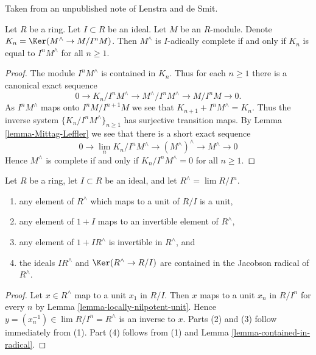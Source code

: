 \begin{lemma}
\label{lemma-hathat}
\begin{reference}
Taken from an unpublished note of Lenstra and de Smit.
\end{reference}
Let $R$ be a ring. Let $I \subset R$ be an ideal. Let $M$ be an $R$-module.
Denote $K_n = \Ker(M^\wedge \to M/I^nM)$. Then $M^\wedge$ is $I$-adically
complete if and only if $K_n$ is equal to $I^nM^\wedge$ for all $n \geq 1$.
\end{lemma}

\begin{proof}
The module $I^n M^\wedge$ is contained in $K_n$.
Thus for each $n \geq 1$ there is a canonical exact sequence
$$
0 \to K_n/I^nM^\wedge \to M^\wedge/I^nM^\wedge \to M/I^nM \to 0.
$$
As $I^nM^\wedge$ maps onto $I^nM/I^{n + 1}M$ we see that
$K_{n + 1} + I^n M^\wedge = K_n$. Thus the inverse system
$\{K_n/I^n M^\wedge\}_{n \geq 1}$ has surjective transition maps.
By
Lemma \ref{lemma-Mittag-Leffler}
we see that there is a short exact sequence
$$
0 \to
\lim_n K_n/I^n M^\wedge \to
(M^\wedge)^\wedge \to
M^\wedge \to 0
$$
Hence $M^\wedge$ is complete if and only if $K_n/I^n M^\wedge = 0$
for all $n \geq 1$.
\end{proof}

\begin{lemma}
\label{lemma-radical-completion}
Let $R$ be a ring, let $I \subset R$ be an ideal, and let
$R^\wedge = \lim R/I^n$.
\begin{enumerate}
\item any element of $R^\wedge$ which maps to a unit of $R/I$ is a unit,
\item any element of $1 + I$ maps to an invertible element of $R^\wedge$,
\item any element of $1 + IR^\wedge$ is invertible in $R^\wedge$, and
\item the ideals $IR^\wedge$ and $\Ker(R^\wedge \to R/I)$ are contained
in the Jacobson radical of $R^\wedge$.
\end{enumerate}
\end{lemma}

\begin{proof}
Let $x \in R^\wedge$ map to a unit $x_1$ in $R/I$.
Then $x$ maps to a unit $x_n$ in $R/I^n$ for every $n$ by
Lemma \ref{lemma-locally-nilpotent-unit}.
Hence $y = (x_n^{-1}) \in \lim R/I^n = R^\wedge$ is an inverse to $x$.
Parts (2) and (3) follow immediately from (1).
Part (4) follows from (1) and Lemma \ref{lemma-contained-in-radical}.
\end{proof}

